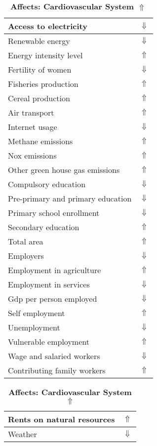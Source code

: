 \documentclass[12pt,notitlepage,oneside]{report}
\begin{document}
\begin{table}[!htb]
\caption{\textbf{Affects: Cardiovascular System $\Uparrow$}}
\centering
\label{Correlated Socio-economic Factors0}
\begin{tabular}{|l|l|}
\hline
Access to electricity & $\Downarrow$\\ \hline
Renewable energy & $\Downarrow$\\ \hline
Energy intensity level & $\Uparrow$\\ \hline
Fertility of women & $\Downarrow$\\ \hline
Fisheries production & $\Uparrow$\\ \hline
Cereal production & $\Uparrow$\\ \hline
Air transport  & $\Uparrow$\\ \hline
Internet usage & $\Downarrow$\\ \hline
Methane emissions & $\Uparrow$\\ \hline
Nox emissions & $\Uparrow$\\ \hline
Other green house gas emissions & $\Uparrow$\\ \hline
Compulsory education & $\Downarrow$\\ \hline
Pre-primary and primary education & $\Downarrow$\\ \hline
Primary school enrollment & $\Downarrow$\\ \hline
Secondary education & $\Uparrow$\\ \hline
Total area & $\Uparrow$\\ \hline
Employers & $\Downarrow$\\ \hline
Employment in agriculture & $\Uparrow$\\ \hline
Employment in services & $\Downarrow$\\ \hline
Gdp per person employed & $\Downarrow$\\ \hline
Self employment & $\Uparrow$\\ \hline
Unemployment & $\Downarrow$\\ \hline
Vulnerable employment & $\Uparrow$\\ \hline
Wage and salaried workers & $\Downarrow$\\ \hline
Contributing family workers & $\Uparrow$\\ \hline
\end{tabular}
\begin{tabular}{|l|l|}
\hline
Rents on natural resources & $\Uparrow$\\ \hline
Weather & $\Downarrow$\\ \hline

\end{tabular}
\end{table}
\end{document}
